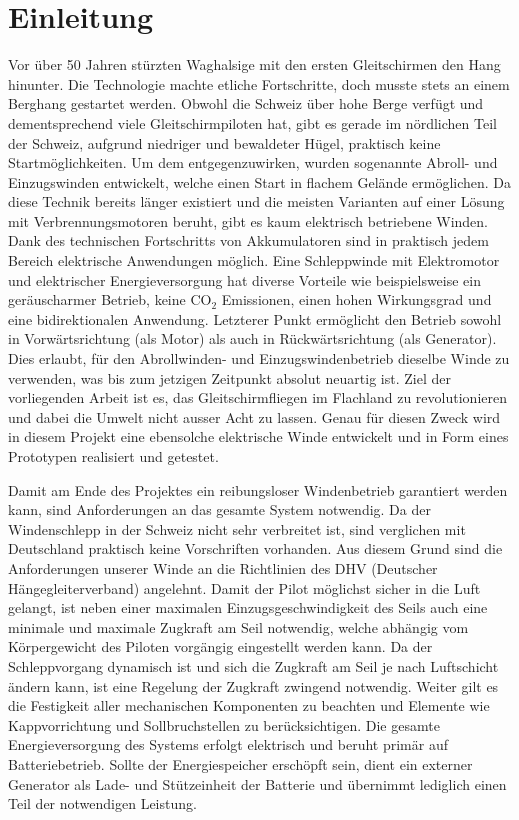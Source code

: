 \section{Einleitung}
Vor über 50 Jahren stürzten Waghalsige mit den ersten Gleitschirmen den Hang hinunter. Die Technologie machte etliche Fortschritte, doch musste stets an einem Berghang gestartet werden. Obwohl die Schweiz über hohe Berge verfügt und dementsprechend viele Gleitschirmpiloten hat, gibt es gerade im nördlichen Teil der Schweiz, aufgrund niedriger und bewaldeter Hügel, praktisch keine Startmöglichkeiten. Um dem entgegenzuwirken, wurden sogenannte Abroll- und Einzugswinden entwickelt, welche einen Start in flachem Gelände ermöglichen. Da diese Technik bereits länger existiert und die meisten Varianten auf einer Lösung mit Verbrennungsmotoren beruht, gibt es kaum elektrisch betriebene Winden. Dank des technischen Fortschritts von Akkumulatoren sind in praktisch jedem Bereich elektrische Anwendungen möglich. Eine Schleppwinde mit Elektromotor und elektrischer Energieversorgung hat diverse Vorteile wie beispielsweise ein geräuscharmer Betrieb, keine CO$_{2}$ Emissionen, einen hohen Wirkungsgrad und eine bidirektionalen Anwendung. Letzterer Punkt ermöglicht den Betrieb sowohl in Vorwärtsrichtung (als Motor) als auch in Rückwärtsrichtung (als Generator). Dies erlaubt, für den Abrollwinden- und Einzugswindenbetrieb dieselbe Winde zu verwenden, was bis zum jetzigen Zeitpunkt absolut neuartig ist. 
Ziel der vorliegenden Arbeit ist es, das Gleitschirmfliegen im Flachland zu revolutionieren und dabei die Umwelt nicht ausser Acht zu lassen. Genau für diesen Zweck wird in diesem Projekt eine ebensolche elektrische Winde entwickelt und in Form eines Prototypen realisiert und getestet.

Damit am Ende des Projektes ein reibungsloser Windenbetrieb garantiert werden kann, sind Anforderungen an das gesamte System notwendig. Da der Windenschlepp in der Schweiz nicht sehr verbreitet ist, sind verglichen mit Deutschland praktisch keine Vorschriften vorhanden. Aus diesem Grund sind die Anforderungen unserer Winde an die Richtlinien des DHV (Deutscher Hängegleiterverband) angelehnt.
Damit der Pilot möglichst sicher in die Luft gelangt, ist neben einer maximalen Einzugsgeschwindigkeit des Seils auch eine minimale und maximale Zugkraft am Seil notwendig, welche abhängig vom Körpergewicht des Piloten vorgängig eingestellt werden kann. Da der Schleppvorgang dynamisch ist und sich die Zugkraft am Seil je nach Luftschicht ändern kann, ist eine Regelung der Zugkraft zwingend notwendig. Weiter gilt es die Festigkeit aller mechanischen Komponenten zu beachten und Elemente wie Kappvorrichtung und Sollbruchstellen zu berücksichtigen. Die gesamte Energieversorgung des Systems erfolgt elektrisch und beruht primär auf Batteriebetrieb. Sollte der Energiespeicher erschöpft sein, dient ein externer Generator als Lade- und Stützeinheit der Batterie und übernimmt lediglich einen Teil der notwendigen Leistung.

